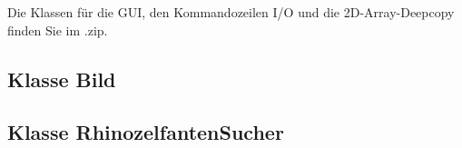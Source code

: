 Die Klassen für die GUI, den Kommandozeilen I/O und die 2D-Array-Deepcopy finden Sie im .zip.
\subsection{Klasse Bild}
	
\clearpage
\subsection{Klasse RhinozelfantenSucher}
	